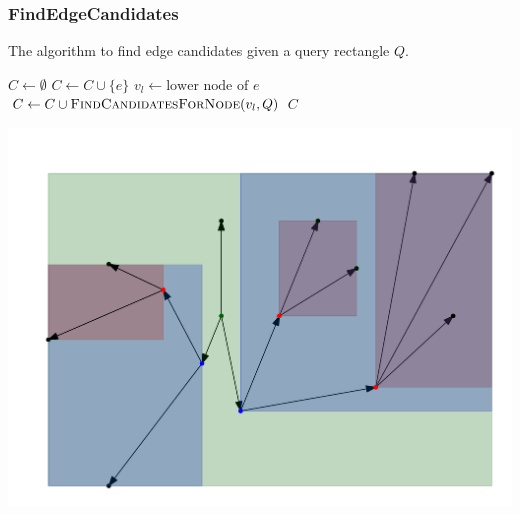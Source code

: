 \documentclass{beamer}
\newcommand{\findEdgeCandidates}{FindEdgeCandidates\xspace}
\begin{document}
\begin{frame}
	\frametitle{\findEdgeCandidates}
	\begin{algorithm}[H]
		\renewcommand{\thealgorithm}{}
		{\tiny
			\caption{The algorithm to find edge candidates given a query rectangle $Q$.}
			\begin{algorithmic}[1]
				\State $C \gets \emptyset$
				\State $C \gets C \cup \{e\}$
				\EndIf
				\State $v_l \gets \text{lower node of $e$}$
				\State $C \gets C \cup \Call{FindCandidatesForNode}{v_l, Q}$
				\EndIf
				\EndFor
				\State \Return $C$
				\EndProcedure
			\end{algorithmic}
		}
	\end{algorithm}
	\includegraphics[width=.45\columnwidth]{images/downgraphBox}
\end{frame}
\end{document}

